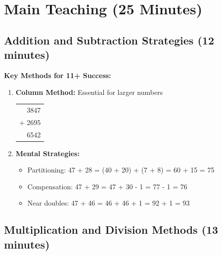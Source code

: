 \documentclass{article}
\begin{document}
\section{Main Teaching (25 Minutes)}

\subsection{Addition and Subtraction Strategies (12 minutes)}

\textbf{Key Methods for 11+ Success:}

\begin{enumerate}
    \item \textbf{Column Method:} Essential for larger numbers
    \begin{center}
    \begin{tabular}{r}
        3847 \\
      + 2695 \\
        \hline
        6542
    \end{tabular}
    \end{center}
    
    \item \textbf{Mental Strategies:}
    \begin{itemize}
        \item Partitioning: 47 + 28 = (40 + 20) + (7 + 8) = 60 + 15 = 75
        \item Compensation: 47 + 29 = 47 + 30 - 1 = 77 - 1 = 76
        \item Near doubles: 47 + 46 = 46 + 46 + 1 = 92 + 1 = 93
    \end{itemize}
\end{enumerate}

\subsection{Multiplication and Division Methods (13 minutes)}
\end{document}
